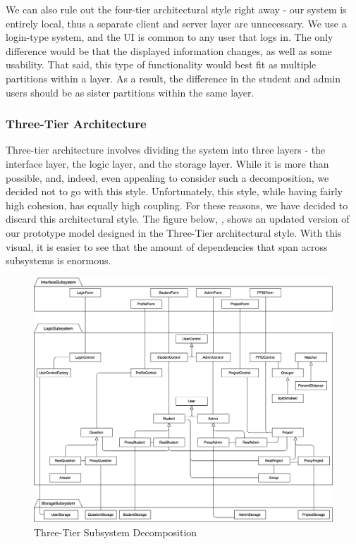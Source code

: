 \documentclass[12pt,letterpaper]{article}
\begin{document}
We can also rule out the four-tier architectural style right away - our system is entirely local, thus a separate client and server layer are unnecessary. We use a login-type system, and the UI is common to any user that logs in. The only difference would be that the displayed information changes, as well as some usability. That said, this type of functionality would best fit as multiple partitions within a layer. As a result, the difference in the student and admin users should be as sister partitions within the same layer.

\subsubsection*{Three-Tier Architecture}

Three-tier architecture involves dividing the system into three layers - the interface layer, the logic layer, and the storage layer. While it is more than possible, and, indeed, even appealing to consider such a decomposition, we decided not to go with this style. Unfortunately, this style, while having fairly high cohesion, has equally high coupling. For these reasons, we have decided to discard this architectural style. The figure below, , shows an updated version of our prototype model designed in the Three-Tier architectural style. With this visual, it is easier to see that the amount of dependencies that span across subsystems is enormous.

\begin{figure}[H]
	\centering{}
	\includegraphics[scale=0.22]{imgs/d3/decomp/three-tier.png}
	\caption{Three-Tier Subsystem Decomposition}
\end{figure}
\end{document}
